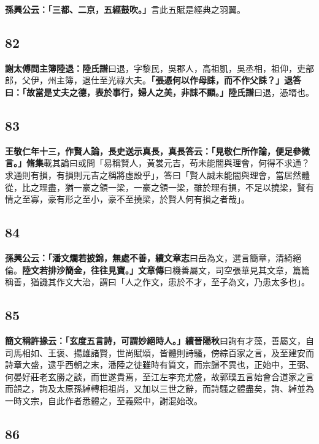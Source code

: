 \textbf{孫興公云：「三都、二京，五經鼓吹。」}{\footnotesize 言此五賦是經典之羽翼。}

\subsection*{82}

\textbf{謝太傅問主簿陸退：}{\footnotesize \textbf{陸氏譜}曰退，字黎民，吳郡人，高祖凱，吳丞相，祖仰，吏部郎，父伊，州主簿，退仕至光祿大夫。}\textbf{「張憑何以作母誄，而不作父誄？」退答曰：「故當是丈夫之德，表於事行，婦人之美，非誄不顯。」}{\footnotesize \textbf{陸氏譜}曰退，憑壻也。}

\subsection*{83}

\textbf{王敬仁年十三，作賢人論，長史送示真長，真長答云：「見敬仁所作論，便足參微言。」}{\footnotesize \textbf{脩集}載其論曰或問「易稱賢人，黃裳元吉，苟未能闇與理會，何得不求通？求通則有損，有損則元吉之稱將虛設乎」，答曰「賢人誠未能闇與理會，當居然體從，比之理盡，猶一豪之領一梁，一豪之領一梁，雖於理有損，不足以撓梁，賢有情之至寡，豪有形之至小，豪不至撓梁，於賢人何有損之者哉」。}

\subsection*{84}

\textbf{孫興公云：「潘文爛若披錦，無處不善，}{\footnotesize \textbf{續文章志}曰岳為文，選言簡章，清綺絕倫。}\textbf{陸文若排沙簡金，往往見寶。」}{\footnotesize \textbf{文章傳}曰機善屬文，司空張華見其文章，篇篇稱善，猶譏其作文大治，謂曰「人之作文，患於不才，至子為文，乃患太多也」。}

\subsection*{85}

\textbf{簡文稱許掾云：「玄度五言詩，可謂妙絕時人。」}{\footnotesize \textbf{續晉陽秋}曰詢有才藻，善屬文，自司馬相如、王褒、揚雄諸賢，世尚賦頌，皆體則詩騷，傍綜百家之言，及至建安而詩章大盛，逮乎西朝之末，潘陸之徒雖時有質文，而宗歸不異也，正始中，王弼、何晏好莊老玄勝之談，而世遂貴焉，至江左李充尤盛，故郭璞五言始會合道家之言而韻之，詢及太原孫綽轉相祖尚，又加以三世之辭，而詩騷之體盡矣，詢、綽並為一時文宗，自此作者悉體之，至義熙中，謝混始改。}

\subsection*{86}

